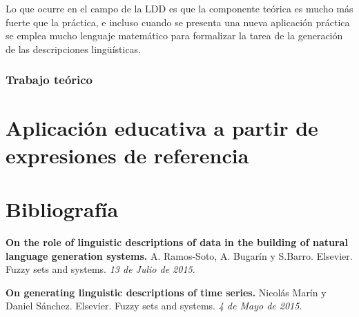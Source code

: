 \documentclass[10pt,a4paper]{article}
\begin{document}
Lo que ocurre en el campo de la LDD es que la componente teórica es mucho más fuerte que la práctica, e incluso cuando se presenta una nueva aplicación práctica se emplea mucho lenguaje matemático para formalizar la tarea de la generación de las descripciones lingüísticas.

\subsubsection{Trabajo teórico}
\section{Aplicación educativa a partir de expresiones de referencia}

\newpage

\section{Bibliografía}
\begin{enumerate}[{[}1{]}]
\item \textbf{On the role of linguistic descriptions of data in the building of natural language generation systems.} A. Ramos-Soto, A. Bugarín y S.Barro. Elsevier. Fuzzy sets and systems. \textit{13 de Julio de 2015}.
\item \textbf{On generating linguistic descriptions of time series.} Nicolás Marín y Daniel Sánchez. Elsevier. Fuzzy sets and systems. \textit{4 de Mayo de 2015}.
\end{enumerate}
\end{document}
